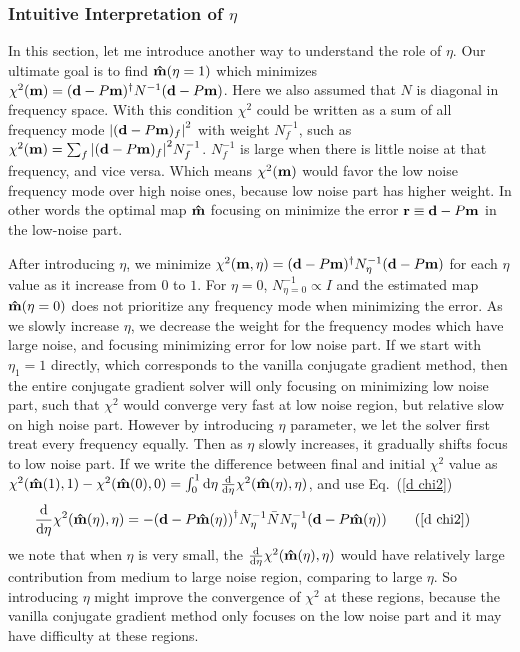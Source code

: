 \documentclass[11pt, letterpaper]{article}
\newcommand{\vbd}{\vb{d}}
\newcommand{\vbm}{\vb{m}}
\newcommand{\inv}[1]{#1^{-1}}
\newcommand{\hatm}{\vb{\hat{m}}}
\newcommand{\Nbar}{\bar{N}}
\newcommand{\Neta}{N_{\eta}}
\begin{document}
\subsubsection{Intuitive Interpretation of $\eta$}\label{intuitive interp}
In this section, let me introduce another way to understand the role of $\eta$.
Our ultimate goal is to find $\hatm(\eta=1)$ which minimizes 
$\chi^2(\vbm) = (\vbd - P\vbm)^{\dagger} \inv{N} (\vbd - P\vbm)$.
Here we also assumed that $N$ is diagonal in frequency space.
With this condition $\chi^2$ could be written as a sum of all frequency mode 
$\qty|(\vbd-P\vbm)_f|^2$ with weight $\inv{N}_f$, such as
$\chi^2(\vbm) = \sum_f \qty|(\vbd-P\vbm)_f|^2 \inv{N}_f$.
$\inv{N}_f$ is large when there is little noise at that frequency,
and vice versa.
Which means $\chi^2(\vbm)$ would favor the low noise frequency mode over high 
noise ones, because low noise part has higher weight.
In other words the optimal map $\hatm$ focusing on minimize the error
$\vb{r} \equiv \vbd - P\vbm$ in the low-noise part.

After introducing $\eta$, we minimize
$\chi^2(\vbm,\eta)=(\vbd-P\vbm)^{\dagger} N_{\eta}^{-1} (\vbd - P\vbm)$
for each $\eta$ value as it increase from $0$ to $1$.
For $\eta=0$, $N^{-1}_{\eta=0} \propto I$ and the estimated map $\hatm(\eta=0)$
does not prioritize any frequency mode when minimizing the error.
As we slowly increase $\eta$, we decrease the weight for the frequency modes
which have large noise, and focusing minimizing error for low noise part.
If we start with $\eta_1=1$ directly, which corresponds to the vanilla conjugate
gradient method, then the entire conjugate gradient solver
will only focusing on minimizing low noise part, such that $\chi^2$ would
converge very fast at low noise region, but relative slow on high noise part.
However by introducing $\eta$ parameter, we let the solver first treat every
frequency equally.
Then as $\eta$ slowly increases, it gradually shifts focus to low noise
part.
If we write the difference between final and initial $\chi^2$ value as
$\chi^2(\hatm(1),1) - \chi^2(\hatm(0),0) = \int_0^1 \dd{\eta}
\dv{\eta} \chi^2(\hatm(\eta),\eta)$,
and use Eq.~(\ref{d chi2})
\begin{align}
\dv{\eta} \chi^2(\hatm(\eta), \eta) 
&= - \qty(\vbd - P\hatm(\eta))^{\dagger} \inv{\Neta} \Nbar \inv{\Neta} 
    (\vbd - P\hatm(\eta)) \tag{\ref{d chi2}}
\end{align}
we note that when $\eta$ is very small, 
the $\dv{\eta}\chi^2(\hatm(\eta),\eta)$ would have relatively large
contribution from medium to large noise region, comparing to large $\eta$.
So introducing $\eta$ might improve the convergence of $\chi^2$ at these
regions, because the vanilla conjugate gradient method only focuses on the low noise
part and it may have difficulty at these regions.
\end{document}
